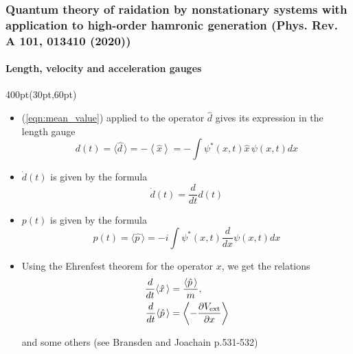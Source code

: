 \begin{frame}
\frametitle{Quantum theory of raidation by nonstationary systems 
	with application to high-order hamronic generation
        (Phys. Rev. A 101, 013410 (2020))}
	\framesubtitle{Length, velocity and acceleration gauges}

\begin{textblock*}{400pt}(30pt,60pt)
\footnotesize
\begin{itemize}
\item (\ref{eqn:mean_value}) applied to the operator $\hat{d}$ gives
its expression in the length gauge
\begin{equation}
d(t) = \langle \hat{d\,} \rangle = - \left\langle\hat{x}\right\rangle
  = - \int \psi^{*}(x,t)\hat{x}\,\psi(x,t)dx
\end{equation}

\item $\dot{d}(t)$ is given by the formula
\begin{equation}
\dot{d}(t) = \frac{d}{dt}d(t)
\end{equation}

\item $p(t)$ is given by the formula
\begin{equation}
p(t) = \langle \hat{p\,} \rangle  
  = - i\int \psi^{*}(x,t)\frac{d}{dx}\psi(x,t)dx
\end{equation}

\item Using the Ehrenfest theorem for the operator $x$, we get the relations 
\begin{align}
\frac{d}{dt}\langle \hat{x\,} \rangle 
        & = \frac{\langle \hat{p\,} \rangle}{m}, \\
\frac{d}{dt} \langle \hat{p\,}\rangle 
        & = \left\langle -\frac{\partial V_{\rm ext}}{\partial x} \right\rangle
\end{align}

and some others (see Bransden and Joachain p.531-532) 



\end{itemize}
\end{textblock*}


\end{frame}




